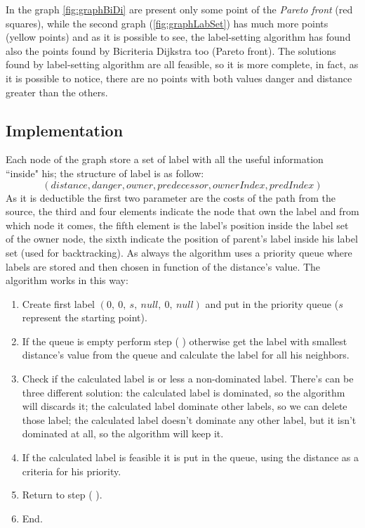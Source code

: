 \documentclass[a4paper,11pt]{report}
\newcommand{\RN}[1]{%
	\textup{\lowercase\expandafter{\romannumeral#1}}%
}
\begin{document}
In the graph \ref{fig:graphBiDi} are present only some point of the \textit{Pareto front} (red squares), while the second graph (\ref{fig:graphLabSet}) has much more points (yellow points) and as it is possible to see, the label-setting algorithm has found also the points found by Bicriteria Dijkstra too (Pareto front). The solutions found by label-setting algorithm are all feasible, so it is more complete, in fact, as it is possible to notice, there are no points with both values danger and distance greater than the others.


\subsection{Implementation}
Each node of the graph store a set of label with all the useful information ``inside" his; the structure of label is as follow:
$$(distance, danger, owner, predecessor, ownerIndex, predIndex)$$
As it is deductible the first two parameter are the costs of the path from the source, the third and four elements indicate the node that own the label and from which node it comes, the fifth element is the label's position inside the label set of the owner node, the sixth indicate the position of parent's label inside his label set (used for backtracking).
As always the algorithm uses a priority queue where labels are stored and then chosen in function of the distance's value. The algorithm works in this way:

\begin{enumerate}[label=\roman*.]
	\item Create first label $(0,\ 0,\ s,\ null,\ 0,\ null)$ and put in the priority queue ($s$ represent the starting point).
	\item If the queue is empty perform step (\RN{6}) otherwise get the label with smallest distance's value from the queue and calculate the label for all his neighbors.
	\item Check if the calculated label is or less a non-dominated label. There's can be three different solution: the calculated label is dominated, so the algorithm will discards it; the calculated label dominate other labels, so we can delete those label; the calculated label doesn't dominate any other label, but it isn't dominated at all, so the algorithm will keep it.
	\item If the calculated label is feasible it is put in the queue, using the distance as a criteria for his priority.
	\item Return to step (\RN{2}).
	\item End.
\end{enumerate}
\end{document}
